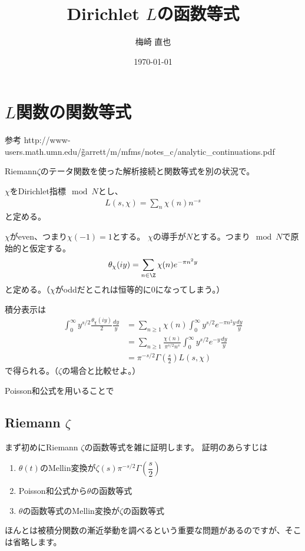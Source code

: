 \documentclass[uplatex, a4paper]{jsbook}
\title{Dirichlet $L$の函数等式}
\author{梅崎 直也}
\date{\today}                                           %
\begin{document}
\maketitle

\chapter{$L$関数の関数等式}

参考
http://www-users.math.umn.edu/\~garrett/m/mfms/notes\_c/analytic\_continuations.pdf

Riemann$\zeta$のテータ関数を使った解析接続と関数等式を別の状況で。

$\chi$をDirichlet指標$\mod N$とし、
\begin{align*}
  L(s,\chi)=\sum_n\chi(n)n^{-s}
\end{align*}
と定める。

$\chi$がeven、つまり$\chi(-1)=1$とする。
$\chi$の導手が$N$とする。つまり$\mod N$で原始的と仮定する。
\begin{align*}
  \theta_\chi(iy)=\sum_{n\in\Z}\chi(n)e^{-\pi n^2y}
\end{align*}
と定める。（$\chi$がoddだとこれは恒等的に$0$になってしまう。）

積分表示は
\begin{align*}
  \int^\infty_0y^{s/2}\frac{\theta_\chi(iy)}{2}\frac{dy}{y}
  &=\sum_{n\geq1}\chi(n)\int^\infty_0y^{s/2}e^{-\pi n^2y}\frac{dy}{y}\\
  &=\sum_{n\geq1}\frac{\chi(n)}{\pi^{s/2}n^s}\int^\infty_0y^{s/2}e^{-y}\frac{dy}{y}\\
  &=\pi^{-s/2}\Gamma(\frac{s}{2})L(s,\chi)
\end{align*}
で得られる。（$\zeta$の場合と比較せよ。）

Poisson和公式を用いることで
  
\section{Riemann $\zeta$}
まず初めにRiemann $\zeta$の函数等式を雑に証明します。
証明のあらすじは
\begin{enumerate}
\item $\theta(t)$のMellin変換が$\zeta(s)\pi^{-s/2}\Gamma(\dfrac{s}{2})$
\item Poisson和公式から$\theta$の函数等式
\item $\theta$の函数等式のMellin変換が$\zeta$の函数等式
\end{enumerate}
ほんとは被積分関数の漸近挙動を調べるという重要な問題があるのですが、そこは省略します。
\end{document}
